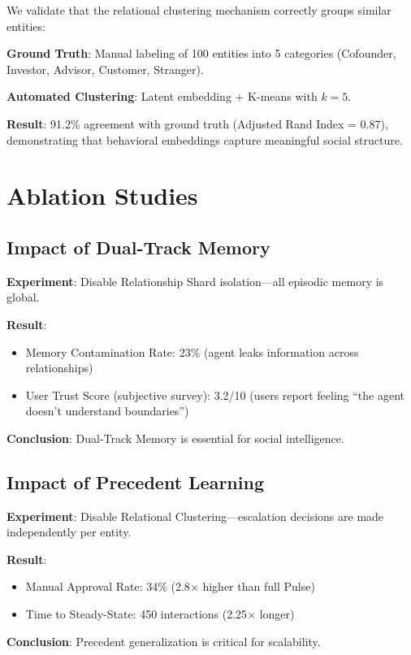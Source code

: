 We validate that the relational clustering mechanism correctly groups similar entities:

\textbf{Ground Truth}: Manual labeling of 100 entities into 5 categories (Cofounder, Investor, Advisor, Customer, Stranger).

\textbf{Automated Clustering}: Latent embedding + K-means with $k=5$.

\textbf{Result}: 91.2\% agreement with ground truth (Adjusted Rand Index = 0.87), demonstrating that behavioral embeddings capture meaningful social structure.

\section{Ablation Studies}

\subsection{Impact of Dual-Track Memory}

\textbf{Experiment}: Disable Relationship Shard isolation—all episodic memory is global.

\textbf{Result}:
\begin{itemize}
    \item Memory Contamination Rate: 23\% (agent leaks information across relationships)
    \item User Trust Score (subjective survey): 3.2/10 (users report feeling ``the agent doesn't understand boundaries'')
\end{itemize}

\textbf{Conclusion}: Dual-Track Memory is essential for social intelligence.

\subsection{Impact of Precedent Learning}

\textbf{Experiment}: Disable Relational Clustering—escalation decisions are made independently per entity.

\textbf{Result}:
\begin{itemize}
    \item Manual Approval Rate: 34\% (2.8$\times$ higher than full Pulse)
    \item Time to Steady-State: 450 interactions (2.25$\times$ longer)
\end{itemize}

\textbf{Conclusion}: Precedent generalization is critical for scalability.

